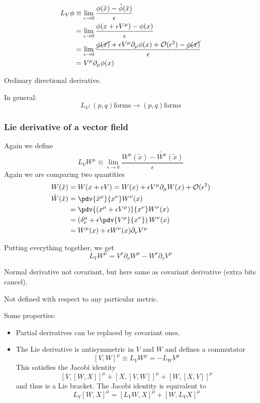 \begin{align*}
L_V\phi &\equiv \lim_{\epsilon\to 0}\frac{\phi(\tilde{x}) - \tilde{\phi}(\tilde{x})}{\epsilon} \\
&= \lim_{\epsilon\to 0}\frac{\phi(x+\epsilon V^\mu)-\phi(x)}{\epsilon} \\
&= \lim_{\epsilon\to 0}\frac{\cancel{\phi(x)}+\epsilon V^\mu\partial_\mu\phi(x)+\mathcal{O}(\epsilon^2)-\cancel{\phi(x)}}{\epsilon} \\
&= V^\mu\partial_\mu\phi(x)
\end{align*}

Ordinary directional derivative.

In general:
\[ L_V: (p,q) \text{forms} \to (p,q) \text{forms} \]

\subsubsection{Lie derivative of a vector field}
Again we define
\[ L_VW^\mu \equiv \lim_{\epsilon\to 0}\frac{W^\mu(\tilde{x}) - \tilde{W^\mu}(\tilde{x})}{\epsilon} \]
Again we are comparing two quantities
\begin{align*}
W(\tilde{x}) &= W(x + \epsilon V) = W(x) + \epsilon V^\mu\partial_\mu W(x) + \mathcal{O}(\epsilon^2) \\
\tilde{W}(\tilde{x}) &= \pdv{\tilde{x}^\mu}{x^\nu}W^\nu (x) \\
&= \pdv{(x^\mu+\epsilon V^\mu)}{x^\nu}W^\nu (x) \\
&= \left(\delta^\mu_\nu+\epsilon \pdv{V^\mu}{x^\nu}\right)W^\nu (x) \\
&= W^\mu (x)+\epsilon W^\nu (x)\partial_\nu V^\mu
\end{align*}

Putting everything together, we get
\[ L_V W^\mu = V^\nu\partial_\nu W^\mu - W^\nu \partial_\nu V^\mu \]

Normal derivative not covariant, but here same as covariant derivative (extra bits cancel).

Not defined with respect to any particular metric.

Some properties:
\begin{itemize}
\item Partial derivatives can be replaced by covariant ones.
\item The Lie derivative is antisymmetric in $V$ and $W$ and defines a commutator
\[ [V,W]^\mu \equiv L_VW^\mu = - L_WV^\mu \]
This satisfies the Jacobi identity 
\[ [V,[W,X]]^\mu + [X,[V,W]]^\mu + [W,[X,V]]^\mu \]
and thus is a Lie bracket.  The Jacobi identity is equivalent to
\[ L_V[W,X]^\mu = [L_VW,X]^\mu + [W,L_VX]^\mu \]
\end{itemize}


